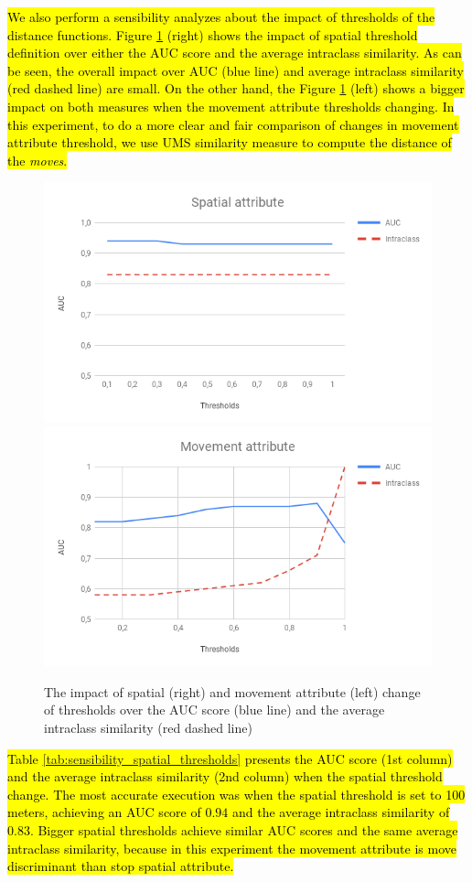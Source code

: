\documentclass[12pt]{article}
\begin{document}
\hl{We also perform a sensibility analyzes about the impact of thresholds of the distance functions. Figure {\ref{fig:sensibility_thresholds}} (right) shows the impact of spatial threshold definition over either the AUC score and the average intraclass similarity. As can be seen, the overall impact over AUC (blue line) and average intraclass similarity (red dashed line) are small. On the other hand, the Figure {\ref{fig:sensibility_thresholds}} (left) shows a bigger impact on both measures when the movement attribute thresholds changing. In this experiment, to do a more clear and fair comparison of changes in movement attribute threshold, we use UMS similarity measure to compute the distance of the \emph{moves}.}


\begin{figure}[ht!]
\centerline{
\centering
\includegraphics[width=.55\textwidth]{Images/StopMove_Spatial_attribute.png}
\includegraphics[width=.55\textwidth]{Images/StopMove_Movement_attribute.png}
}
\caption{The impact of spatial (right) and movement attribute (left) change of thresholds over the AUC score (blue line) and the average intraclass similarity (red dashed line)}
\label{fig:sensibility_thresholds}
\end{figure}

\hl{Table {\ref{tab:sensibility_spatial_thresholds}} presents the AUC score (1st column) and the average intraclass similarity (2nd column) when the spatial threshold change. The most accurate execution was when the spatial threshold is set to 100 meters, achieving an AUC score of $0.94$ and the average intraclass similarity of $0.83$. Bigger spatial thresholds achieve similar AUC scores and the same average intraclass similarity, because in this experiment the movement attribute is move discriminant than stop spatial attribute.}
\end{document}
